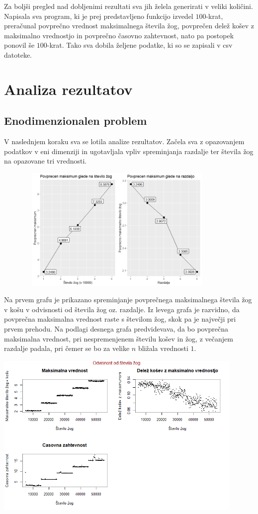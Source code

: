 \documentclass[a4paper, 11pt]{article}
\begin{document}
Za boljši pregled nad dobljenimi rezultati sva jih želela generirati v veliki količini.
Napisala sva program, ki je prej predstavljeno funkcijo izvedel $100$-krat, preračunal povprečno vrednost maksimalnega števila žog, povprečen delež košev z maksimalno vrednostjo
in povprečno časovno zahtevnost, nato pa postopek ponovil še $100$-krat. 
Tako sva dobila željene podatke, ki so se zapisali v csv datoteke. 

\section{Analiza rezultatov}
\subsection{Enodimenzionalen problem}
V naslednjem koraku sva se lotila analize rezultatov. Začela sva z opazovanjem podatkov v eni dimenziji in ugotavljala vpliv spreminjanja razdalje ter števila žog na opazovane tri vrednosti.
\bigbreak

\includegraphics[width=12cm, height=6cm]{povprecje_1dim1.png}

Na prvem grafu je prikazano spreminjanje povprečnega maksimalnega števila žog v košu v odvisnosti od števila žog oz. razdalje.
Iz levega grafa je razvidno, da povprečna maksimalna vrednost raste s številom žog, skok pa je največji pri prvem prehodu.
Na podlagi desnega grafa predvidevava, da bo povprečna maksimalna vrednost, pri nespremenjenem številu košev in žog, z večanjem razdalje padala, pri čemer se bo za velike $n$ bližala vrednosti $1$.
\bigbreak


\includegraphics[width=12cm, height=8cm]{dim1_glede_na_stevilo_zog1.png}
\end{document}
